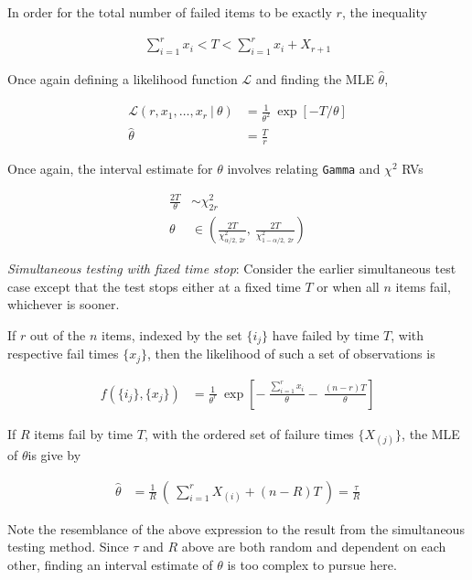 In order for the total number of failed items to be exactly \(r\), the inequality

\begin{align}
	\sum\limits_{i=1}^r x_i < T < \sum\limits_{i=1}^r x_i + X_{r+1}
\end{align}

Once again defining a likelihood function \( \mathcal{L} \) and finding the MLE \(\widehat{\theta}\),

\begin{align}
	\mathcal{L}(r, x_1, \dots, x_r\ |\ \theta) &= \frac{1}{\theta^2}\ \exp[-T/\theta] \\[1ex]
	\widehat{\theta} &= \frac{T}{r}
\end{align}

Once again, the interval estimate for \(\theta\) involves relating \texttt{Gamma} and \(\chi^2\) RVs

\begin{align}
	\frac{2T}{\theta} &\sim \chi^2_{2r} \\[1ex]
	\theta &\in \left( \frac{2 T}{\chi^2_{\alpha/2,\ 2r}},\ \frac{2 T}{\chi^2_{1 - \alpha/2,\ 2r}} \right)
\end{align}

\textit{Simultaneous testing with fixed time stop}: Consider the earlier simultaneous test case except that the test stops either at a fixed time \(T\) or when all \(n\) items fail, whichever is sooner.

If \(r\) out of the \(n\) items, indexed by the set \(\{i_j\}\) have failed by time \(T\), with respective fail times \(\{x_j\}\), then the likelihood of such a set of observations is

\begin{align}
	f(\{i_j\}, \{x_j\}) &= \frac{1}{\theta^r}\ \exp \left[ -\ \frac{\sum_{i=1}^r x_i}{\theta} -\ \frac{(n-r)T}{\theta} \right]
\end{align}

If \(R\) items fail by time \(T\), with the ordered set of failure times \(\{X_{(j)}\}\), the MLE of \(\theta\)is give by

\begin{align}
	\widehat{\theta} &= \frac{1}{R}\ \left(\ \sum_{i=1}^r X_{(i)} + (n-R)T \ \right) = \frac{\tau}{R}
\end{align}

Note the resemblance of the above expression to the result from the simultaneous testing method. Since \(\tau\) and \(R\) above are both random and dependent on each other, finding an interval estimate of \(\theta\) is too complex to pursue here.

